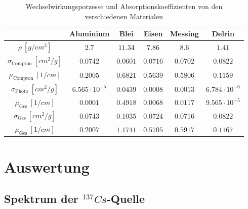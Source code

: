 \begin{table}[H]
  \centering
  \begin{tabular}{c|c c c c c}
    \toprule
     {} & Aluminium & Blei & Eisen & Messing & Delrin \\
    \midrule
     $\rho \:[g/cm^3]$                    &$ 2.7              $ & $11.34 $ & $7.86  $ & $8.6   $ & $1.41               $ \\
     $\sigma_{\text{Compton}} \:[cm^2/g]$ &$0.0742            $ & $0.0601$ & $0.0716$ & $0.0702$ & $0.0822             $\\
     $\mu_\text{Compton} \:[1/cm]$        &$0.2005            $ & $0.6821$ & $0.5639$ & $0.5806$ & $0.1159             $ \\
     $\sigma_\text{Photo}\:[cm^2/g]$      &$6.565\cdot 10^{-5}$ & $0.0439$ & $0.0008$ & $0.0013$ & $6.784\cdot 10^{-6} $ \\
     $\mu_\text{Ges} \:[1/cm]$            &$0.0001            $ & $0.4918$ & $0.0068$ & $0.0117$ & $9.565 \cdot 10^{-5}$\\
     $\sigma_\text{Ges}\:[cm^2/g]$        &$0.0743            $ & $0.1035$ & $0.0724$ & $0.0716$ & $0.0822             $      \\
     $\mu_\text{Ges} \:[1/cm]$            &$ 0.2007           $ & $1.1741$ & $0.5705$ & $0.5917$ & $0.1167             $\\
    \bottomrule
  \end{tabular}
  \caption{Wechselwirkungsporzesse und Absorptionskoeffizienten von den verschiedenen Materialen \cite{XCOM}}
  \label{tab:lit}
\end{table}

\section{Auswertung}
\label{sec:Auswertung}
\subsection{Spektrum der $^{137}Cs$-Quelle}

